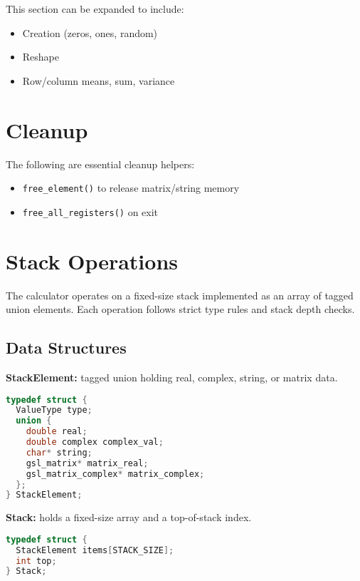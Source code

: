 \documentclass[12pt]{article}
\begin{document}
This section can be expanded to include:

\begin{itemize}
  \item Creation (zeros, ones, random)
  \item Reshape
  \item Row/column means, sum, variance
\end{itemize}

\section{Cleanup}

The following are essential cleanup helpers:

\begin{itemize}
  \item \texttt{free\_element()} to release matrix/string memory
  \item \texttt{free\_all\_registers()} on exit
\end{itemize}

\section{Stack Operations}

The calculator operates on a fixed-size stack implemented as an array of tagged union elements. Each operation follows strict type rules and stack depth checks.

\subsection{Data Structures}

\textbf{StackElement:} tagged union holding real, complex, string, or matrix data.

\begin{lstlisting}[language=C]
typedef struct {
  ValueType type;
  union {
    double real;
    double complex complex_val;
    char* string;
    gsl_matrix* matrix_real;
    gsl_matrix_complex* matrix_complex;
  };
} StackElement;
\end{lstlisting}

\textbf{Stack:} holds a fixed-size array and a top-of-stack index.

\begin{lstlisting}[language=C]
typedef struct {
  StackElement items[STACK_SIZE];
  int top;
} Stack;
\end{lstlisting}
\end{document}
